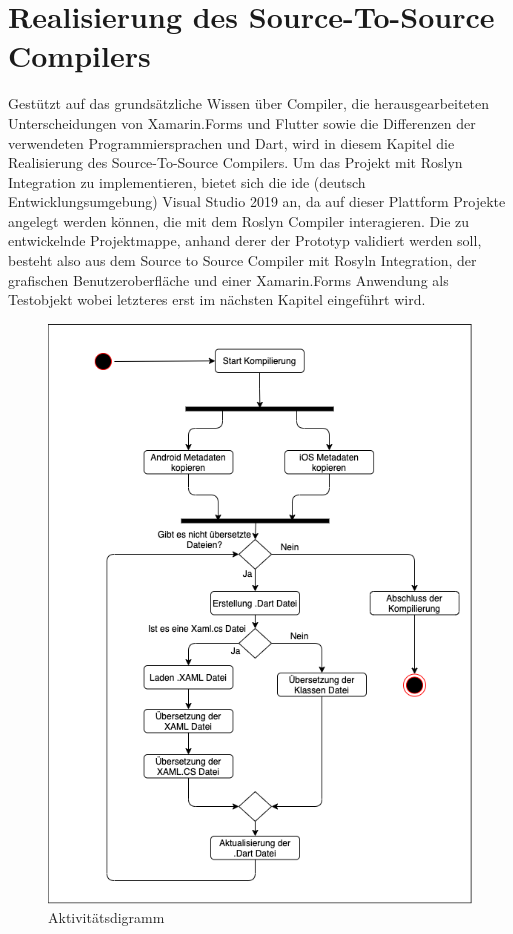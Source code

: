 \chapter{Realisierung des Source-To-Source Compilers}
\label{chap:Realisierung}
Gestützt auf das grundsätzliche Wissen über Compiler, die herausgearbeiteten Unterscheidungen von  Xamarin.Forms und Flutter sowie die Differenzen der verwendeten Programmiersprachen  \Csharp und Dart, wird in diesem Kapitel die Realisierung des Source-To-Source Compilers. Um das Projekt mit Roslyn Integration zu implementieren,  bietet sich die \ac{ide} (deutsch Entwicklungsumgebung) Visual Studio 2019 an, da auf dieser Plattform Projekte angelegt werden können, die mit dem Roslyn Compiler interagieren. Die zu entwickelnde Projektmappe, anhand derer der Prototyp validiert werden soll, besteht also aus dem Source to Source Compiler mit Rosyln Integration, der grafischen  Benutzeroberfläche und einer  Xamarin.Forms Anwendung als Testobjekt wobei letzteres erst im nächsten Kapitel eingeführt wird. 

\begin{figure}[!ht]
 \includegraphics[width=\textwidth,keepaspectratio]{Images/Implementation/Ablauf.png}
 \caption{Aktivitätsdigramm}
 \label{fig:umlablauf}
\end{figure}



